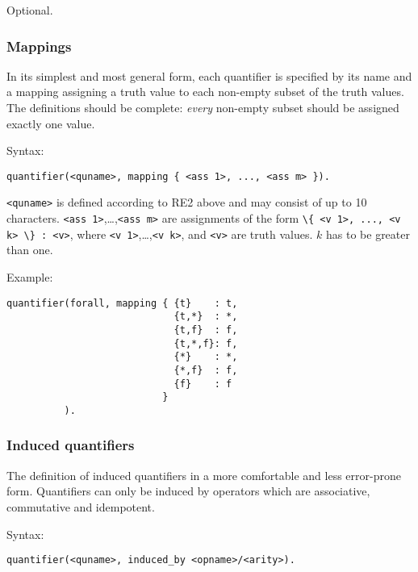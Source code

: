 \documentclass[]{article}
\newcommand{\passthrough}[1]{#1}
\begin{document}
Optional.

\hypertarget{mappings-1}{%
\subsubsection{Mappings}\label{mappings-1}}

In its simplest and most general form, each quantifier is specified by
its name and a mapping assigning a truth value to each non-empty subset
of the truth values. The definitions should be complete: \emph{every}
non-empty subset should be assigned exactly one value.

Syntax:

\begin{lstlisting}
quantifier(<quname>, mapping { <ass 1>, ..., <ass m> }).
\end{lstlisting}

\passthrough{\lstinline!<quname>!} is defined according to RE2 above and
may consist of up to 10 characters.
\passthrough{\lstinline!<ass 1>!},\ldots{},\passthrough{\lstinline!<ass m>!}
are assignments of the form
\passthrough{\lstinline!\{ <v 1>, ..., <v k> \} : <v>!}, where
\passthrough{\lstinline!<v 1>!},\ldots{},\passthrough{\lstinline!<v k>!},
and \passthrough{\lstinline!<v>!} are truth values. \(k\) has to be
greater than one.

Example:

\begin{lstlisting}
quantifier(forall, mapping { {t}    : t,
                             {t,*}  : *,
                             {t,f}  : f,
                             {t,*,f}: f,
                             {*}    : *,
                             {*,f}  : f,
                             {f}    : f
                           }
          ).
\end{lstlisting}

\hypertarget{induced-quantifiers}{%
\subsubsection{Induced quantifiers}\label{induced-quantifiers}}

The definition of induced quantifiers in a more comfortable and less
error-prone form. Quantifiers can only be induced by operators which are
associative, commutative and idempotent.

Syntax:

\begin{lstlisting}
quantifier(<quname>, induced_by <opname>/<arity>).
\end{lstlisting}
\end{document}
